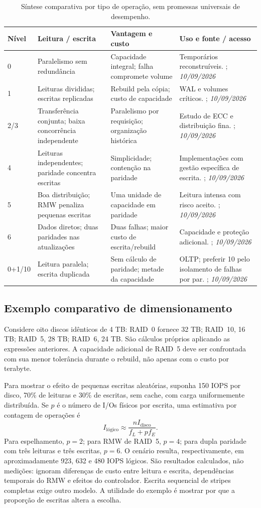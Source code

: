\documentclass[titlepage]{article}
\newcommand{\acesso}{\textit{10/09/2026}}
\begin{document}
\begin{table}[htbp]
\centering\footnotesize
\begin{tabularx}{\textwidth}{lXXX}
\toprule
Nível & Leitura / escrita & Vantagem e custo & Uso e fonte / acesso \\
\midrule
0 & Paralelismo sem redundância & Capacidade integral; falha compromete volume & Temporários reconstruíveis. \cite{redhat_raid}; \acesso \\
1 & Leituras divididas; escritas replicadas & Rebuild pela cópia; custo de capacidade & WAL e volumes críticos. \cite{silberschatz2020}; \acesso \\
2/3 & Transferência conjunta; baixa concorrência independente & Paralelismo por requisição; organização histórica & Estudo de ECC e distribuição fina. \cite{patterson1988}; \acesso \\
4 & Leituras independentes; paridade concentra escritas & Simplicidade; contenção na paridade & Implementações com gestão específica de escrita. \cite{redhat_raid}; \acesso \\
5 & Boa distribuição; RMW penaliza pequenas escritas & Uma unidade de capacidade em paridade & Leitura intensa com risco aceito. \cite{raid5_io}; \acesso \\
6 & Dados diretos; duas paridades nas atualizações & Duas falhas; maior custo de escrita/rebuild & Capacidade e proteção adicional. \cite{plank2008}; \acesso \\
0+1/10 & Leitura paralela; escrita duplicada & Sem cálculo de paridade; metade da capacidade & OLTP; preferir 10 pelo isolamento de falhas por par. \cite{dbbook_storage}; \acesso \\
\bottomrule
\end{tabularx}
\caption{Síntese comparativa por tipo de operação, sem promessas universais de desempenho.}
\end{table}

\subsection{Exemplo comparativo de dimensionamento}
Considere oito discos idênticos de 4 TB: RAID~0 fornece 32 TB; RAID~10, 16 TB; RAID~5, 28 TB; RAID~6, 24 TB. São cálculos próprios aplicando as expressões anteriores. A capacidade adicional de RAID~5 deve ser confrontada com sua menor tolerância durante o rebuild, não apenas com o custo por terabyte.

Para mostrar o efeito de pequenas escritas aleatórias, suponha 150 IOPS por disco, 70\% de leituras e 30\% de escritas, sem cache, com carga uniformemente distribuída. Se $p$ é o número de I/Os físicos por escrita, uma estimativa por contagem de operações é
\[
I_{\mathrm{lógico}}\approx\frac{nI_{\mathrm{disco}}}{f_L+p f_E}.
\]
Para espelhamento, $p=2$; para RMW de RAID~5, $p=4$; para dupla paridade com três leituras e três escritas, $p=6$. O cenário resulta, respectivamente, em aproximadamente 923, 632 e 480 IOPS lógicos. São resultados calculados, não medições: ignoram diferenças de custo entre leitura e escrita, dependências temporais do RMW e efeitos do controlador. Escrita sequencial de stripes completas exige outro modelo. A utilidade do exemplo é mostrar por que a proporção de escritas altera a escolha.
\end{document}
